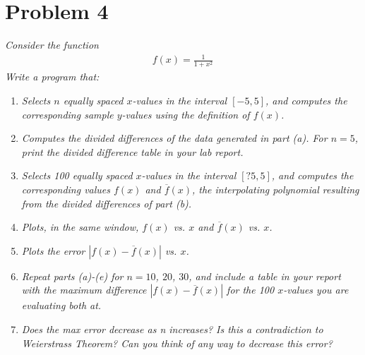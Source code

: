 \documentclass[12pt]{article}
\begin{document}
\section*{Problem 4}
{\it Consider the function}
\begin{align*}
f(x) = \frac{1}{1 + x^2}
\end{align*}
{\it Write a program that:}
\begin{enumerate}[\ \ (a)\ \ ]
\item {\it Selects $n$ equally spaced  $x$-values  in the interval $[-5, 5]$, and computes the corresponding  sample $y$-values using the definition of  $f(x)$.}
\item {\it Computes the divided differences of the  data generated in part {\rm (a)}.  For $n=5$, print the divided difference table in your lab report.}
\item {\it Selects 100 equally spaced $x$-values in the interval $[?5, 5]$, and computes the corresponding values $f(x)$ and $\overline{f}(x)$, the interpolating polynomial resulting from the divided differences of part {\rm (b)}.}
\item {\it Plots, in the same window, $f(x)$ vs. $x$ and $\overline{f}(x)$ vs. $x$.}
\item {\it Plots the error $|f(x) - \overline{f}(x)|$ vs. $x$.}
\item {\it Repeat parts {\rm (a)}-{\rm (e)} for $n = 10$, $20$, $30$, and include a table in your report with the maximum difference $|f(x) - \overline{f}(x)|$ for the 100 $x$-values you are evaluating both at.}
\item {\it Does the max error decrease as n increases? Is this a contradiction to Weierstrass Theorem?  Can you think of any way to decrease this error?}
\end{enumerate}
\end{document}
